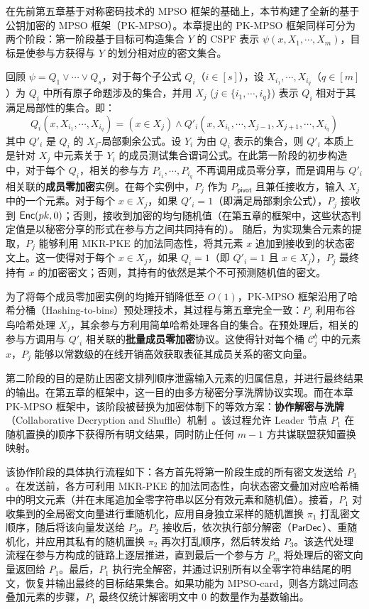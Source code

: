在先前第五章基于对称密码技术的 MPSO 框架的基础上，本节构建了全新的基于公钥加密的 MPSO 框架（PK-MPSO）。本章提出的 PK-MPSO 框架同样可分为两个阶段：第一阶段基于目标可构造集合 $Y$ 的 CSPF 表示 $\psi(x, X_1, \cdots, X_m)$，目标是使参与方获得与 $Y$ 的划分相对应的密文集合。

回顾 $\psi = Q_1 \lor \cdots \lor Q_s$，对于每个子公式 $Q_i$（$i \in [s]$），设 $X_{i_1},\cdots,X_{i_q}$（$q \in [m]$）为 $Q_i$ 中所有原子命题涉及的集合，并用 $X_j$ ($j \in \{{i_1},\cdots,{i_q}\}$) 表示 $Q_i$ 相对于其满足局部性的集合。即：
$$Q_i(x,X_{i_1},\cdots,X_{i_q}) = (x \in X_j) \land Q'_i(x,X_{i_1},\cdots,X_{j-1},X_{j+1},\cdots,X_{i_q})$$ 
其中 $Q'_i$ 是 $Q_i$ 的 $X_j$-局部剩余公式。设 $Y_i$ 为由 $Q_i$ 表示的集合，则 $Q'_i$ 本质上是针对 $X_j$ 中元素关于 $Y_i$ 的成员测试集合谓词公式。在此第一阶段的初步构造中，对于每个 $Q_i$，相关的参与方 $P_{i_1},\cdots,P_{i_q}$ 不再调用成员零分享，而是调用与 $Q'_i$ 相关联的\textbf{成员零加密}实例。在每个实例中，$P_j$ 作为 $P_{\mathsf{pivot}}$ 且兼任接收方，输入 $X_j$ 中的一个元素。对于每个 $x \in X_j$，如果 $Q'_i = 1$（即满足局部剩余公式），$P_j$ 接收到 $\mathsf{Enc}(pk, 0)$；否则，接收到加密的均匀随机值（在第五章的框架中，这些状态判定值是以秘密分享的形式在参与方之间共同持有的）。
随后，为实现集合元素的提取，$P_j$ 能够利用 MKR-PKE 的加法同态性，将其元素 $x$ 追加到接收到的状态密文上。这一使得对于每个 $x \in X_j$，如果 $Q_i = 1$（即 $Q'_i = 1$ 且 $x \in X_j$），$P_j$ 最终持有 $x$ 的加密密文；否则，其持有的依然是某个不可预测随机值的密文。

为了将每个成员零加密实例的均摊开销降低至 $O(1)$，PK-MPSO 框架沿用了哈希分桶（Hashing-to-bins）预处理技术，其过程与第五章完全一致：$P_j$ 利用布谷鸟哈希处理 $X_j$，其余参与方利用简单哈希处理各自的集合。在预处理后，相关的参与方调用与 $Q'_i$ 相关联的\textbf{批量成员零加密}协议。这使得针对每个桶 $\mathcal{C}_j^b$ 中的元素 $x$，$P_j$ 能够以常数级的在线开销高效获取表征其成员关系的密文向量。

第二阶段的目的是防止因密文排列顺序泄露输入元素的归属信息，并进行最终结果的输出。在第五章的框架中，这一目的由多方秘密分享洗牌协议实现。而在本章 PK-MPSO 框架中，该阶段被替换为加密体制下的等效方案：\textbf{协作解密与洗牌}（Collaborative Decryption and Shuffle）机制~\cite{GNT-eprint-2023}。该过程允许 Leader 节点 $P_1$ 在随机置换的顺序下获得所有明文结果，同时防止任何 $m-1$ 方共谋联盟获知置换映射。

该协作阶段的具体执行流程如下：各方首先将第一阶段生成的所有密文发送给 $P_1$。在发送前，各方可利用 MKR-PKE 的加法同态性，向状态密文叠加对应哈希桶中的明文元素（并在末尾追加全零字符串以区分有效元素和随机值）。接着，$P_1$ 对收集到的全局密文向量进行重随机化，应用自身独立采样的随机置换 $\pi_1$ 打乱密文顺序，随后将该向量发送给 $P_2$。$P_2$ 接收后，依次执行部分解密（$\mathsf{ParDec}$）、重随机化，并应用其私有的随机置换 $\pi_2$ 再次打乱顺序，然后转发给 $P_3$。该迭代处理流程在参与方构成的链路上逐层推进，直到最后一个参与方 $P_m$ 将处理后的密文向量返回给 $P_1$。最后，$P_1$ 执行完全解密，并通过识别所有以全零字符串结尾的明文，恢复并输出最终的目标结果集合。如果功能为 MPSO-card，则各方跳过同态叠加元素的步骤，$P_1$ 最终仅统计解密明文中 0 的数量作为基数输出。

